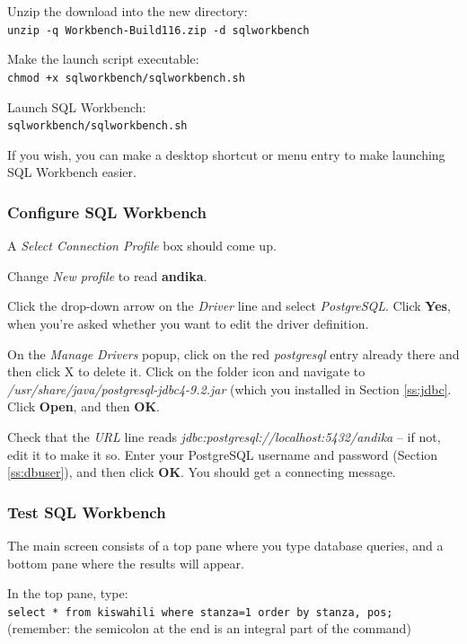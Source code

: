 Unzip the download into the new directory:\\
\verb|unzip -q Workbench-Build116.zip -d sqlworkbench|

Make the launch script executable:\\
\verb|chmod +x sqlworkbench/sqlworkbench.sh|

Launch SQL Workbench:\\
\verb|sqlworkbench/sqlworkbench.sh|

If you wish, you can make a desktop shortcut or menu entry to make launching SQL Workbench easier.

\subsubsection{Configure SQL Workbench}

A \textit{Select Connection Profile} box should come up. 

Change \textit{New profile} to read \textbf{andika}.

Click the drop-down arrow on the \textit{Driver} line and select \textit{PostgreSQL}. Click \textbf{Yes}, when you're asked whether you want to edit the driver definition.

On the \textit{Manage Drivers} popup, click on the red \textit{postgresql} entry already there and then click X to delete it.  Click on the folder icon and navigate to \textit{/usr/share/java/postgresql-jdbc4-9.2.jar} (which you installed in Section \ref{ss:jdbc}.  Click \textbf{Open}, and then \textbf{OK}.

Check that the \textit{URL} line reads \textit{jdbc:postgresql://localhost:5432/andika} -- if not, edit it to make it so. Enter your PostgreSQL username and password (Section \ref{ss:dbuser}), and then click \textbf{OK}.  You should get a connecting message.

\subsubsection{Test SQL Workbench}

The main screen consists of a top pane where you type database queries, and a bottom pane where the results will appear. 

In the top pane, type:\\
\verb|select * from kiswahili where stanza=1 order by stanza, pos;|\\
(remember: the semicolon at the end is an integral part of the command)

